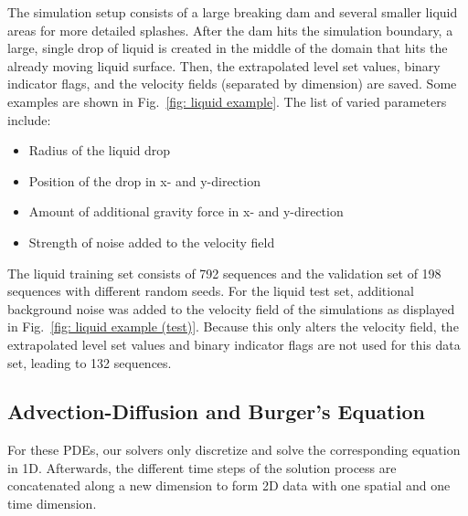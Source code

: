 The simulation setup consists of a large breaking dam and several smaller liquid areas for more detailed splashes. After the dam hits the simulation boundary, a large, single drop of liquid is created in the middle of the domain that hits the already moving liquid surface. Then, the extrapolated level set values, binary indicator flags, and the velocity fields (separated by dimension) are saved.
Some examples are shown in Fig.~\ref{fig: liquid example}. The list of varied parameters include:
\vspace{-0.2cm}
\begin{itemize}
    \setlength\itemsep{0em}
    \item Radius of the liquid drop
    \item Position of the drop in x- and y-direction
    \item Amount of additional gravity force in x- and y-direction
    \item Strength of noise added to the velocity field
\end{itemize}

The liquid training set consists of 792 sequences and the validation set of 198 sequences with different random seeds. For the liquid test set, additional background noise was added to the velocity field of the simulations as displayed in Fig.~\ref{fig: liquid example (test)}. Because this only alters the velocity field, the extrapolated level set values and binary indicator flags are not used for this data set, leading to 132 sequences.


\subsection{Advection-Diffusion and Burger's Equation}
For these PDEs, our solvers only discretize and solve the corresponding equation in 1D. Afterwards, the different time steps of the solution process are concatenated along a new dimension to form 2D data with one spatial and one time dimension.

